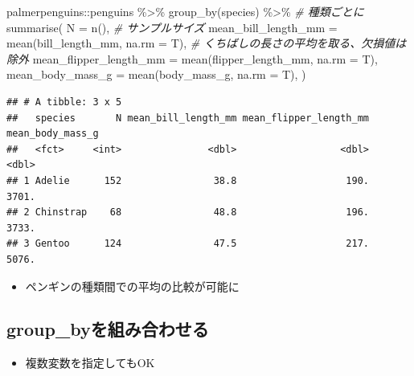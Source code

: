 \documentclass[
]{ltjsarticle}
\newenvironment{Shaded}{\begin{snugshade}}{\end{snugshade}}
\newcommand{\AttributeTok}[1]{\textcolor[rgb]{0.77,0.63,0.00}{#1}}
\newcommand{\CommentTok}[1]{\textcolor[rgb]{0.56,0.35,0.01}{\textit{#1}}}
\newcommand{\FunctionTok}[1]{\textcolor[rgb]{0.00,0.00,0.00}{#1}}
\newcommand{\NormalTok}[1]{#1}
\newcommand{\SpecialCharTok}[1]{\textcolor[rgb]{0.00,0.00,0.00}{#1}}
\providecommand{\tightlist}{%
  \setlength{\itemsep}{0pt}\setlength{\parskip}{0pt}}
\begin{document}
\begin{Shaded}
\begin{Highlighting}[]
\NormalTok{palmerpenguins}\SpecialCharTok{::}\NormalTok{penguins }\SpecialCharTok{\%\textgreater{}\%}
  \FunctionTok{group\_by}\NormalTok{(species) }\SpecialCharTok{\%\textgreater{}\%} \CommentTok{\# 種類ごとに}
  \FunctionTok{summarise}\NormalTok{(}
    \AttributeTok{N =} \FunctionTok{n}\NormalTok{(), }\CommentTok{\# サンプルサイズ}
    \AttributeTok{mean\_bill\_length\_mm =} \FunctionTok{mean}\NormalTok{(bill\_length\_mm, }\AttributeTok{na.rm =}\NormalTok{ T), }\CommentTok{\# くちばしの長さの平均を取る、欠損値は除外}
    \AttributeTok{mean\_flipper\_length\_mm =} \FunctionTok{mean}\NormalTok{(flipper\_length\_mm, }\AttributeTok{na.rm =}\NormalTok{ T),}
    \AttributeTok{mean\_body\_mass\_g =} \FunctionTok{mean}\NormalTok{(body\_mass\_g, }\AttributeTok{na.rm =}\NormalTok{ T),}
\NormalTok{  )}
\end{Highlighting}
\end{Shaded}

\begin{verbatim}
## # A tibble: 3 x 5
##   species       N mean_bill_length_mm mean_flipper_length_mm mean_body_mass_g
##   <fct>     <int>               <dbl>                  <dbl>            <dbl>
## 1 Adelie      152                38.8                   190.            3701.
## 2 Chinstrap    68                48.8                   196.            3733.
## 3 Gentoo      124                47.5                   217.            5076.
\end{verbatim}

\begin{itemize}
\tightlist
\item
  ペンギンの種類間での平均の比較が可能に
\end{itemize}

\hypertarget{group_byux3092ux7d44ux307fux5408ux308fux305bux308b-1}{%
\subsection{group\_byを組み合わせる}\label{group_byux3092ux7d44ux307fux5408ux308fux305bux308b-1}}

\begin{itemize}
\tightlist
\item
  複数変数を指定してもOK
\end{itemize}
\end{document}
